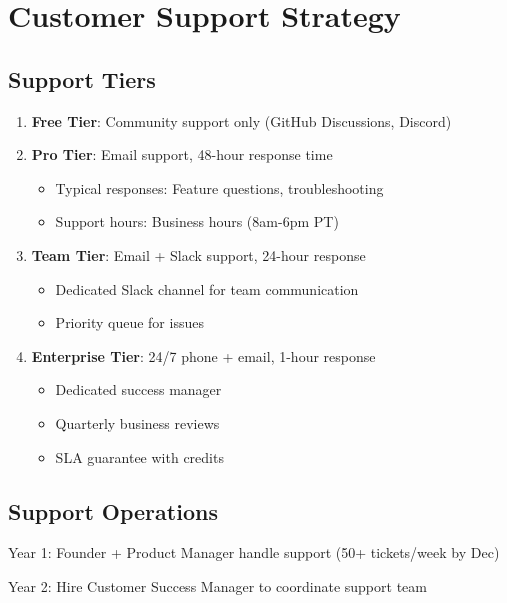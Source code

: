 \documentclass{report}
\begin{document}
\section{Customer Support Strategy}

\subsection{Support Tiers}

\begin{enumerate}
    \item \textbf{Free Tier}: Community support only (GitHub Discussions, Discord)
    
    \item \textbf{Pro Tier}: Email support, 48-hour response time
    \begin{itemize}
        \item Typical responses: Feature questions, troubleshooting
        \item Support hours: Business hours (8am-6pm PT)
    \end{itemize}
    
    \item \textbf{Team Tier}: Email + Slack support, 24-hour response
    \begin{itemize}
        \item Dedicated Slack channel for team communication
        \item Priority queue for issues
    \end{itemize}
    
    \item \textbf{Enterprise Tier}: 24/7 phone + email, 1-hour response
    \begin{itemize}
        \item Dedicated success manager
        \item Quarterly business reviews
        \item SLA guarantee with credits
    \end{itemize}
\end{enumerate}

\subsection{Support Operations}

Year 1: Founder + Product Manager handle support (50+ tickets/week by Dec)

Year 2: Hire Customer Success Manager to coordinate support team
\end{document}
